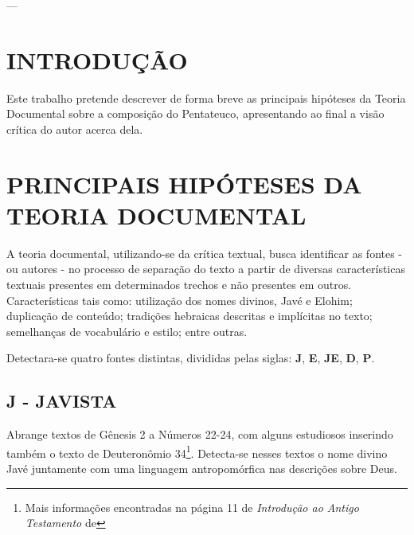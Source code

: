 \documentclass[
    article,            %
	12pt,				%
	oneside,			%
	a4paper,			%
	english,			%
	french,				%
	spanish,			%
	brazil				%
	]{abntex2}
\begin{document}



\imprimircapa

\imprimirfolhaderosto

---
\tableofcontents*
\cleardoublepage

\textual

\section{INTRODUÇÃO}
Este trabalho pretende descrever de forma breve as principais hipóteses da Teoria Documental sobre a composição do Pentateuco, apresentando ao final a visão crítica do autor acerca dela.

\section{PRINCIPAIS HIPÓTESES DA TEORIA DOCUMENTAL}
A teoria documental, utilizando-se da crítica textual, busca identificar as fontes - ou autores - no processo de separação do texto a partir de diversas características textuais presentes em determinados trechos e não presentes em outros. Características tais como: utilização dos nomes divinos, Javé e Elohim; duplicação de conteúdo; tradições hebraicas descritas e implícitas no texto; semelhanças de vocabulário e estilo; entre outras.

Detectara-se quatro fontes distintas, divididas pelas siglas: \textbf{J}, \textbf{E}, \textbf{JE}, \textbf{D}, \textbf{P}.

\subsection{J - JAVISTA}
Abrange textos de Gênesis 2 a Números 22-24, com alguns estudiosos inserindo também o texto de Deuteronômio 34\footnote{Mais informações encontradas na página 11 de \emph{Introdução ao Antigo Testamento} de }. Detecta-se nesses textos o nome divino Javé juntamente com uma linguagem antropomórfica nas descrições sobre Deus.
\end{document}
